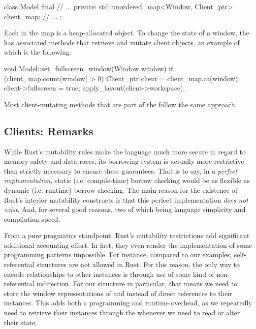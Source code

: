 \begin{cppblock}
  class Model final
  {
    // ...
  private:
    std::unordered_map<Window, Client_ptr> client_map;
    // ...
  };
\end{cppblock}

Each  in the map is a heap-allocated object. To change the
state of a window, the  has associated methods that retrieve and
mutate client objects, an example of which is the following:

\begin{cppblock}
  void
  Model::set_fullscreen_window(Window window)
  {
    if (client_map.count(window) > 0) {
      Client_ptr client = client_map.at(window);
      client->fullscreen = true;
      apply_layout(client->workspace);
    }
  }
\end{cppblock}

Most client-mutating methods that are part of the  follow the same
approach.

\subsection{Clients: Remarks}

While Rust's mutability rules make the language much more secure in regard to
memory-safety and data races, its borrowing system is actually more restrictive
than strictly necessary to ensure these guarantees. That is to say, in a
\textit{perfect implementation}, static (i.e. compile-time) borrow checking
would be as flexible as dynamic (i.e. runtime) borrow checking. The main reason
for the existence of Rust's interior mutability constructs is that this perfect
implementation \textit{does not exist}. And, for several good reasons, two of
which being language simplicity and compilation speed.

From a pure pragmatics standpoint, Rust's mutability restrictions add
significant additional accounting effort. In fact, they even render the
implementation of some programming patterns impossible. For instance, compared
to our \cpp examples, self-referential structures are not allowed in Rust.
For this reason, the only way to encode relationships to other instances is
through use of some kind of non-referential indirection. For our 
structure in particular, that means we need to store the window representations
of  and  instead of direct references to their
 instances. This adds both a programming and runtime overhead, as
we repeatedly need to retrieve their instances through the 
whenever we need to read or alter their state.




